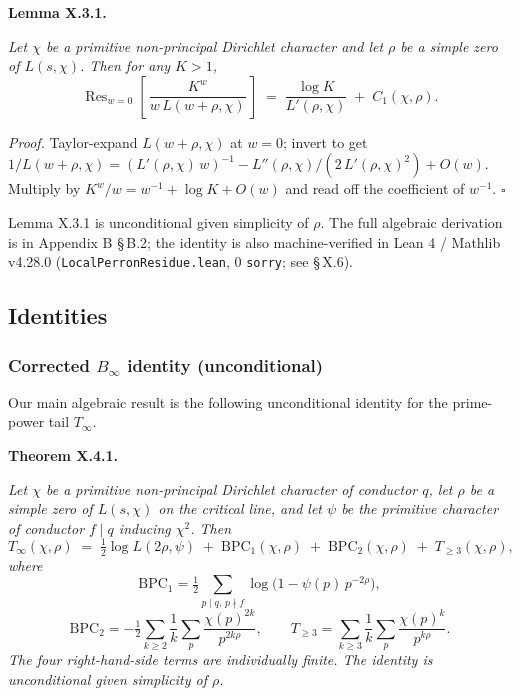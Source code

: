 \hypertarget{lemma:X.3.1}{\textbf{Lemma X.3.1.}} \emph{Let \(\chi\) be a primitive non-principal Dirichlet
character and let \(\rho\) be a simple zero of \(L(s,\chi)\). Then for
any \(K > 1\),}
\begin{equation}
\label{eq:res}
\mathop{\mathrm{Res}}_{w = 0}\!\left[\,\frac{K^{w}}{w\,L(w + \rho,\chi)}\,\right]
\;=\;
\frac{\log K}{L'(\rho,\chi)} \;+\; C_1(\chi,\rho).
\end{equation}

\emph{Proof.} Taylor-expand \(L(w + \rho,\chi)\) at \(w = 0\); invert to get
\(1/L(w+\rho,\chi) = (L'(\rho,\chi)\,w)^{-1} - L''(\rho,\chi)/(2\,L'(\rho,\chi)^2) + O(w)\).
Multiply by \(K^w/w = w^{-1} + \log K + O(w)\) and read off the
coefficient of \(w^{-1}\). \(\square\)

Lemma X.3.1 is unconditional given simplicity of \(\rho\). The full
algebraic derivation is in Appendix B \S\,B.2; the identity is also
machine-verified in Lean 4 / Mathlib v4.28.0 (\texttt{LocalPerronResidue.lean},
0 \texttt{sorry}; see \S\,X.6).

\subsection{Identities}

\subsubsection{Corrected \(B_\infty\) identity (unconditional)}

Our main algebraic result is the following unconditional identity
for the prime-power tail \(T_\infty\).

\hypertarget{theorem:X.4.1}{\textbf{Theorem X.4.1.}} \emph{Let \(\chi\) be a primitive non-principal Dirichlet
character of conductor \(q\), let \(\rho\) be a simple zero of
\(L(s,\chi)\) on the critical line, and let \(\psi\) be the primitive
character of conductor \(f \mid q\) inducing \(\chi^2\). Then}
\begin{equation}
\label{eq:Binfty}
T_\infty(\chi,\rho)
\;=\;
\tfrac12 \log L(2\rho,\psi)
\;+\; \mathrm{BPC}_1(\chi,\rho)
\;+\; \mathrm{BPC}_2(\chi,\rho)
\;+\; T_{\ge 3}(\chi,\rho),
\end{equation}
\emph{where}
\[
\mathrm{BPC}_1 = \tfrac12 \sum_{p \mid q,\, p \nmid f}
\log\bigl(1 - \psi(p)\,p^{-2\rho}\bigr),
\]
\[
\mathrm{BPC}_2 = -\tfrac12 \sum_{k \ge 2}\frac1k \sum_p \frac{\chi(p)^{2k}}{p^{2k\rho}},
\qquad
T_{\ge 3} = \sum_{k \ge 3}\frac1k \sum_p \frac{\chi(p)^k}{p^{k\rho}}.
\]
\emph{The four right-hand-side terms are individually finite. The identity
is unconditional given simplicity of \(\rho\).}

